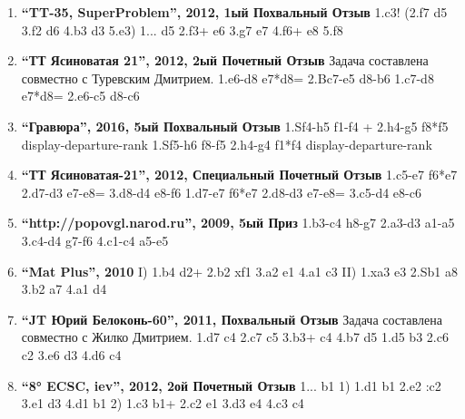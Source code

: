 \begin{enumerate}
\item \textbf{ ``TT-35, SuperProblem'', 2012, 1ый Похвальный Отзыв } 1.\king{}c3! (2.\queen{}f7 d5 3.\queen{}f2 d6 4.\king{}b3 \king{}d3 5.\queen{}e3\mate{})
  1... \king{}d5 2.\queen{}f3+ \king{}e6 3.\bishop{}g7 \king{}e7 4.\queen{}f6+ \king{}e8 5.\queen{}f8\mate{}

\item \textbf{ ``ТТ Ясиноватая 21'', 2012, 2ый Почетный Отзыв } Задача составлена совместно с Туревским Дмитрием.
1.\knight{}e6-d8 e7*d8=\bishop{}   2.Bc7-e5 \bishop{}d8-b6 \mate{}
1.\bishop{}c7-d8 e7*d8=\knight{}   2.\knight{}e6-c5 \knight{}d8-c6 \mate{}

\item \textbf{ ``Гравюра'', 2016, 5ый Похвальный Отзыв } 1.Sf4-h5 \rook{}f1-f4 +   2.\king{}h4-g5 \rook{}f8*f5 \mate{} {display-departure-rank}
1.Sf5-h6 \rook{}f8-f5   2.\king{}h4-g4 \rook{}f1*f4 \mate{} {display-departure-rank}

\item \textbf{ ``ТТ Ясиноватая-21'', 2012, Специальный Почетный Отзыв } 1.\bishop{}c5-e7 f6*e7   2.\rook{}d7-d3 e7-e8=\knight{}  3.\rook{}d8-d4 \knight{}e8-f6 \mate{} 
1.\rook{}d7-e7 f6*e7   2.\rook{}d8-d3 e7-e8=\bishop{}   3.\bishop{}c5-d4 \bishop{}e8-c6 \mate{}

\item \textbf{ ``http://popovgl.narod.ru'', 2009, 5ый Приз } 1.\king{}b3-c4 \king{}h8-g7 2.\queen{}a3-d3 \queen{}a1-a5 3.\king{}c4-d4 \king{}g7-f6 4.\queen{}c1-c4 \queen{}a5-e5 \mate{}

\item \textbf{ ``Mat Plus'', 2010 } I) 1.\knight{}b4 \bishop{}d2+ 2.\king{}b2 \rook{}xf1 3.\knight{}a2 \bishop{}e1 4.\king{}a1 \bishop{}c3\mate{}
II) 1.\knight{}xa3 \bishop{}e3 2.Sb1 \rook{}a8 3.\king{}b2 \bishop{}a7 4.\king{}a1 \bishop{}d4\mate{}

\item \textbf{ ``JT Юрий Белоконь-60'', 2011, Похвальный Отзыв }  Задача составлена совместно с Жилко Дмитрием. 1.\knight{}d7 c4 2.\bishop{}c7 c5 3.\rook{}b3+ \king{}c4 4.\rook{}b7 d5\mate{} 
1.\king{}d5 \king{}b3 2.\knight{}c6 \king{}c2 3.\rook{}e6 \king{}d3 4.\bishop{}d6 c4\mate{}

\item \textbf{ ``8° ECSC, \king{}iev'', 2012, 2ой Почетный Отзыв } 1... \rook{}b1\mate{}
1)  1.\king{}d1 \king{}b1 2.\king{}e2 \king{}:c2 3.\king{}e1 \king{}d3 4.\king{}d1 \rook{}b1\mate{}
2)  1.\rook{}c3 \rook{}b1+ 2.\king{}c2 \rook{}e1 3.\rook{}d3 \rook{}e4 4.\king{}c3 \rook{}c4\mate{}


\end{enumerate}
